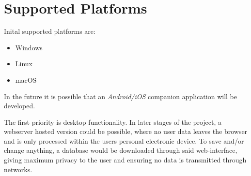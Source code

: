 
\chapter{Supported Platforms}
Inital supported platforms are:
\begin{itemize}
	\item Windows
	\item Linux
	\item macOS
\end{itemize}

In the future it is possible that an \emph{Android/iOS} companion application will be developed.

The first priority is desktop functionality. In later stages of the project, a webserver hosted version could be possible, where no user data leaves the browser and is only processed within the users personal electronic device. To save and/or change anything, a database would be downloaded through said web-interface, giving maximum privacy to the user and ensuring no data is transmitted through networks.

\sentinelchapterend
